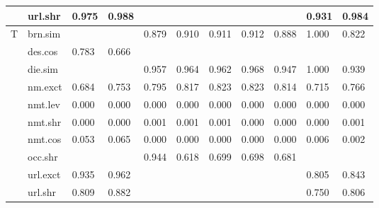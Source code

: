 \documentclass[epsfig,a4paper,11pt,titlepage,twoside,openany]{book}
\begin{document}
\begin{table}[]
\begin{tabular}{ll|l|l|l|l|l|l|l|l|l|}
\multicolumn{1}{|l|}{}                                 & url.shr  & 0.975       & 0.988          &       &          &          &          &        & 0.931         & 0.984            \\ \hline \hline
\multicolumn{1}{|l|}{\multirow{10}{*}{T}}       & brn.sim  &             &                & 0.879 & 0.910    & 0.911    & 0.912    & 0.888  & 1.000         & 0.822            \\ \cline{2-11} 
\multicolumn{1}{|l|}{}                                 & des.cos  & 0.783       & 0.666          &       &          &          &          &        &               &                  \\ \cline{2-11} 
\multicolumn{1}{|l|}{}                                 & die.sim  &             &                & 0.957 & 0.964    & 0.962    & 0.968    & 0.947  & 1.000         & 0.939            \\ \cline{2-11} 
\multicolumn{1}{|l|}{}                                 & nm.exct  & 0.684       & 0.753          & 0.795 & 0.817    & 0.823    & 0.823    & 0.814  & 0.715         & 0.766            \\ \cline{2-11} 
\multicolumn{1}{|l|}{}                                 & nmt.lev  & 0.000       & 0.000          & 0.000 & 0.000    & 0.000    & 0.000    & 0.000  & 0.000         & 0.000            \\ \cline{2-11} 
\multicolumn{1}{|l|}{}                                 & nmt.shr  & 0.000       & 0.000          & 0.001 & 0.001    & 0.001    & 0.000    & 0.000  & 0.000         & 0.001            \\ \cline{2-11} 
\multicolumn{1}{|l|}{}                                 & nmt.cos  & 0.053       & 0.065          & 0.000 & 0.000    & 0.000    & 0.000    & 0.000  & 0.006         & 0.002            \\ \cline{2-11} 
\multicolumn{1}{|l|}{}                                 & occ.shr  &             &                & 0.944 & 0.618    & 0.699    & 0.698    & 0.681  &               &                  \\ \cline{2-11} 
\multicolumn{1}{|l|}{}                                 & url.exct & 0.935       & 0.962          &       &          &          &          &        & 0.805         & 0.843            \\ \cline{2-11} 
\multicolumn{1}{|l|}{}                                 & url.shr  & 0.809       & 0.882          &       &          &          &          &        & 0.750         & 0.806            \\ \hline \hline

\end{tabular}
\end{table}
\end{document}
